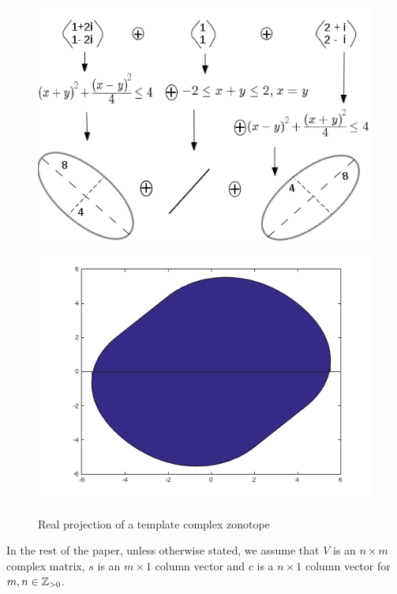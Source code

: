 \begin{figure}
\center
\includegraphics[scale=0.7]{fig/complex-zonotope.png}
\includegraphics[scale=0.5]{fig/CZhull.png}
\caption{Real projection of a template complex zonotope}
\label{fig:cz}
\end{figure}
%




In the rest of the paper, unless otherwise stated, we assume that $V$
is an $n\times m$ complex matrix, $s$ is an $m\times 1$ column vector
and $c$ is a $n\times 1$ column vector for $m,n\in\mathbb{Z}_{> 0}$.

